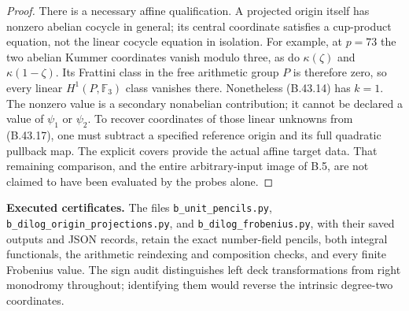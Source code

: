 \begin{proof}
There is a necessary affine qualification.  A projected
origin itself has nonzero abelian cocycle in general;
its central coordinate satisfies a cup-product equation,
not the linear cocycle equation in isolation.  For example,
at $p=73$ the two abelian Kummer coordinates vanish modulo
three, as do $\kappa(\zeta)$ and $\kappa(1-\zeta)$.
Its Frattini class in the free arithmetic group $P$ is
therefore zero, so every linear $H^1(P,\mathbb F_3)$
class vanishes there.  Nonetheless (B.43.14) has $k=1$.
The nonzero value is a secondary nonabelian contribution;
it cannot be declared a value of $\psi_1$ or $\psi_2$.
To recover coordinates of those linear unknowns from
(B.43.17), one must subtract a specified reference origin
and its full quadratic pullback map.  The explicit covers
provide the actual affine target data.  That remaining
comparison, and the entire arbitrary-input image of B.5,
are not claimed to have been evaluated by the probes alone.
\end{proof}

\par\smallskip\noindent\textbf{Executed certificates.}
The files \texttt{b\_unit\_pencils.py},
\texttt{b\_dilog\_origin\_projections.py}, and
\texttt{b\_dilog\_frobenius.py}, with their saved outputs
and JSON records, retain the exact number-field pencils,
both integral functionals, the arithmetic reindexing and
composition checks, and every finite Frobenius value.
The sign audit distinguishes left deck transformations
from right monodromy throughout; identifying them would
reverse the intrinsic degree-two coordinates.
